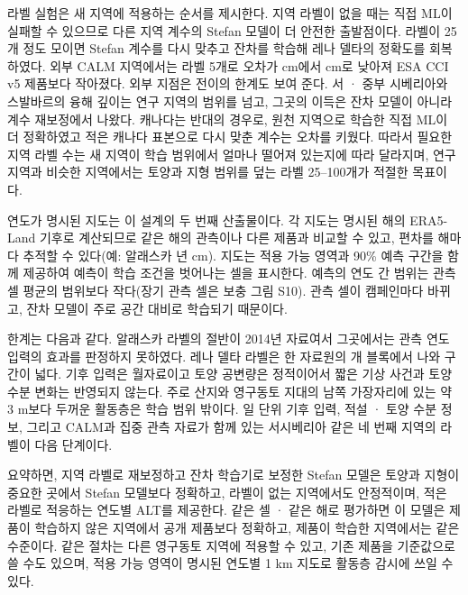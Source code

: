 라벨 실험은 새 지역에 적용하는 순서를 제시한다. 지역 라벨이 없을 때는 직접 ML이 실패할 수 있으므로 다른 지역 계수의 Stefan 모델이 더 안전한 출발점이다. 라벨이 25개 정도 모이면 Stefan 계수를 다시 맞추고 잔차를 학습해 레나 델타의 정확도를 회복하였다. 외부 CALM 지역에서는 라벨 5개로 오차가 \nftAllRszero{} cm에서 \nftAllRsfive{} cm로 낮아져 ESA CCI v5 제품보다 작아졌다. 외부 지점은 전이의 한계도 보여 준다. 서 · 중부 시베리아와 스발바르의 융해 깊이는 연구 지역의 범위를 넘고, 그곳의 이득은 잔차 모델이 아니라 계수 재보정에서 나왔다. 캐나다는 반대의 경우로, 원천 지역으로 학습한 직접 ML이 더 정확하였고 적은 캐나다 표본으로 다시 맞춘 계수는 오차를 키웠다. 따라서 필요한 지역 라벨 수는 새 지역이 학습 범위에서 얼마나 떨어져 있는지에 따라 달라지며, 연구 지역과 비슷한 지역에서는 토양과 지형 범위를 덮는 라벨 25--100개가 적절한 목표이다.

연도가 명시된 지도는 이 설계의 두 번째 산출물이다. 각 지도는 명시된 해의 ERA5-Land 기후로 계산되므로 같은 해의 관측이나 다른 제품과 비교할 수 있고, 편차를 해마다 추적할 수 있다(예: 알래스카 \nanmaxyrAk{}년 \nanmaxAk{} cm). 지도는 적용 가능 영역과 90\% 예측 구간을 함께 제공하여 예측이 학습 조건을 벗어나는 셀을 표시한다. 예측의 연도 간 범위는 관측 셀 평균의 범위보다 작다(장기 관측 셀은 보충 그림 S10). 관측 셀이 캠페인마다 바뀌고, 잔차 모델이 주로 공간 대비로 학습되기 때문이다.

한계는 다음과 같다. 알래스카 라벨의 절반이 2014년 자료여서 그곳에서는 관측 연도 입력의 효과를 판정하지 못하였다. 레나 델타 라벨은 한 자료원의 \nnblkLe{}개 블록에서 나와 구간이 넓다. 기후 입력은 월자료이고 토양 공변량은 정적이어서 짧은 기상 사건과 토양 수분 변화는 반영되지 않는다. 주로 산지와 영구동토 지대의 남쪽 가장자리에 있는 약 3 m보다 두꺼운 활동층은 학습 범위 밖이다. 일 단위 기후 입력, 적설 · 토양 수분 정보, 그리고 CALM과 집중 관측 자료가 함께 있는 서시베리아 같은 네 번째 지역의 라벨이 다음 단계이다.

요약하면, 지역 라벨로 재보정하고 잔차 학습기로 보정한 Stefan 모델은 토양과 지형이 중요한 곳에서 Stefan 모델보다 정확하고, 라벨이 없는 지역에서도 안정적이며, 적은 라벨로 적응하는 연도별 ALT를 제공한다. 같은 셀 · 같은 해로 평가하면 이 모델은 제품이 학습하지 않은 지역에서 공개 제품보다 정확하고, 제품이 학습한 지역에서는 같은 수준이다. 같은 절차는 다른 영구동토 지역에 적용할 수 있고, 기존 제품을 기준값으로 쓸 수도 있으며, 적용 가능 영역이 명시된 연도별 1 km 지도로 활동층 감시에 쓰일 수 있다.
